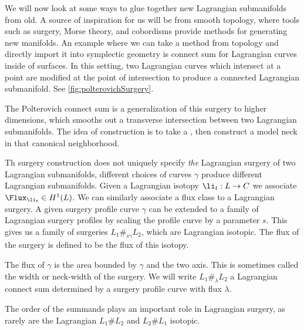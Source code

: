 
We will now look at some ways to glue together new Lagrangian submanifolds from old.
A source of inspiration for us will be from smooth topology, where tools such as surgery, Morse theory, and cobordisms provide methods for generating new manifolds.
An example where we can take a method from topology and directly import it into symplectic geometry is connect sum for Lagrangian curves inside of surfaces.
In this setting, two Lagrangian curves which intersect at a point are modified at the point of intersection to produce a connected Lagrangian submanifold.
See \cref{fig:polterovichSurgery}.

The Polterovich connect sum is a generalization of this surgery to higher dimensions, which smooths out a transverse intersection between two Lagrangian submanifolds. 
The idea of construction is to take a  , then construct a model neck in that canonical neighborhood. 



Th surgery construction does not uniquely specify \emph{the} Lagrangian surgery of two Lagrangian submanifolds,  different choices of curves $\gamma$ produce different Lagrangian submanifolds.
Given a Lagrangian isotopy $\li_t: L\to C$ we associate  $\Flux_{\li_t}\in H^1(L)$. 
We can similarly associate a flux class to a Lagrangian surgery.
A given surgery profile curve $\gamma$ can be extended to a family of Lagrangian surgery profiles by scaling the profile curve by a parameter $s$.  
This gives us a family of surgeries $L_1\#_{s\gamma} L_2$, which are Lagrangian isotopic.
The flux of the surgery is defined to be the flux of this isotopy. 

The flux of $\gamma$ is the area bounded by $\gamma$ and the two axis. This is sometimes called the width or neck-width of the surgery.
We will write $L_1\#_{\lambda}L_2$ a Lagrangian connect sum determined by a surgery profile curve with flux $\lambda$.

The order of the summands plays an important role in Lagrangian surgery, as rarely are the Lagrangian $L_1\#L_2$ and $L_2\#L_1$ isotopic. 


